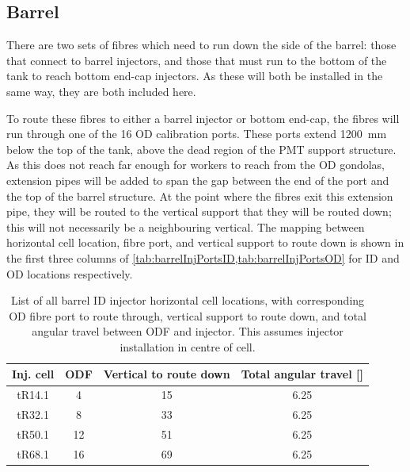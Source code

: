 \documentclass[a4paper,11pt]{article}
\begin{document}
\subsection{Barrel}\label{sec:lengths:sub:barrel}

There are two sets of fibres which need to run down the side of the barrel: those that connect to barrel injectors, and those that must run to the bottom of the tank to reach bottom end-cap injectors. As these will both be installed in the same way, they are both included here.

To route these fibres to either a barrel injector or bottom end-cap, the fibres will run through one of the 16 OD calibration ports. These ports extend 1200~mm below the top of the tank, above the dead region of the PMT support structure. As this does not reach far enough for workers to reach from the OD gondolas, extension pipes will be added to span the gap between the end of the port and the top of the barrel structure. At the point where the fibres exit this extension pipe, they will be routed to the vertical support that they will be routed down; this will not necessarily be a neighbouring vertical. The mapping between horizontal cell location, fibre port, and vertical support to route down is shown in the first three columns of \cref{tab:barrelInjPortsID,tab:barrelInjPortsOD} for ID and OD locations respectively.\begin{table}
\centering
\begin{tabular}{cccc}\toprule
Inj. cell	&	ODF	&	Vertical to route down	&	Total angular travel	[\degree ]	\\ \midrule
tR14.1		&	4	&		15					&		6.25		\\
tR32.1		&	8	&		33					&		6.25		\\
tR50.1		&	12	&		51					&		6.25		\\
tR68.1		&	16	&		69					&		6.25		\\
 \bottomrule
\end{tabular}
\caption{List of all barrel ID injector horizontal cell locations, with corresponding OD fibre port to route through, vertical support to route down, and total angular travel between ODF and injector. This assumes injector installation in centre of cell.}\label{tab:barrelInjPortsID}
\end{table}
\end{document}
